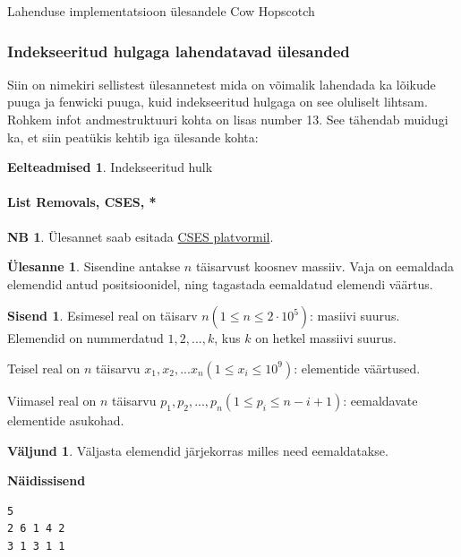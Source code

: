 \documentclass{trkut}
\theoremstyle{definition}
\newtheorem*{prereq}{Eelteadmised}
\newtheorem*{extra}{NB}
\newtheorem*{Input}{Sisend}
\newtheorem*{Output}{Väljund}
\newtheorem*{Text}{Ülesanne}
\begin{document}
 \begin{kk}[H]%
    \caption{Lahenduse implementatsioon ülesandele Cow Hopscotch}%
    \label{EMaxx}%
    \end{kk}
    
\subsubsection{Indekseeritud hulgaga lahendatavad ülesanded}
Siin on nimekiri sellistest ülesannetest mida on võimalik lahendada ka lõikude puuga ja fenwicki puuga, kuid indekseeritud hulgaga on see oluliselt lihtsam.
Rohkem infot andmestruktuuri kohta on lisas number 13.
See tähendab muidugi ka, et siin peatükis kehtib iga ülesande kohta:
\begin{prereq}
Indekseeritud hulk
\end{prereq}


\paragraph{List Removals, CSES, *}
\begin{extra}
Ülesannet saab esitada \href{https://cses.fi/problemset/task/1749}{CSES platvormil}.
\end{extra}
\begin{Text}
Sisendine antakse $n$ täisarvust koosnev massiiv. Vaja on eemaldada elemendid antud positsioonidel, ning tagastada eemaldatud elemendi väärtus.

\parencite{list}
\end{Text}
\begin{Input}
Esimesel real on täisarv $n$$(1\le n\le 2\cdot 10^5)$: masiivi suurus. Elemendid on nummerdatud $1,2,...,k$, kus $k$ on hetkel massiivi suurus.

Teisel real on $n$ täisarvu $x_1,x_2,...x_n$$(1\le x_i\le 10^9)$: elementide väärtused.

Viimasel real on $n$ täisarvu $p_1,p_2,...,p_n$$(1\le p_i\le n-i+1)$: eemaldavate elementide asukohad.
\end{Input}
\begin{Output}
Väljasta elemendid järjekorras milles need eemaldatakse.
\end{Output}


\textbf{Näidissisend}

\begin{verbatim}
5
2 6 1 4 2
3 1 3 1 1
\end{verbatim}
\end{document}
